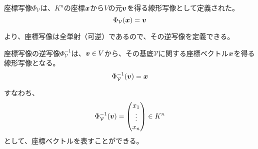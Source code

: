 \documentclass[../../../topic_linear-algebra]{subfiles}
\begin{document}
\br

座標写像$\Phi_{\mathcal{V}}$は、$K^n$の座標$\vb*{x}$から$V$の元$\vb*{v}$を得る線形写像として定義された。
\begin{equation*}
  \Phi_{\mathcal{V}}(\vb*{x}) = \vb*{v}
\end{equation*}

より、座標写像は全単射（可逆）であるので、その逆写像を定義できる。

座標写像の逆写像$\Phi_{\mathcal{V}}^{-1}$は、$\vb*{v} \in V$から、その基底$\mathcal{V}$に関する座標ベクトル$\vb*{x}$を得る線形写像となる。
\begin{equation*}
  \Phi^{-1}_\mathcal{V}(\vb*{v}) = \vb*{x}
\end{equation*}

すなわち、
\begin{equation*}
  \Phi^{-1}_\mathcal{V}(\vb*{v}) = \begin{pmatrix}
    x_1    \\
    \vdots \\
    x_n
  \end{pmatrix}
  \in K^n
\end{equation*}
として、座標ベクトルを表すことができる。
\end{document}
